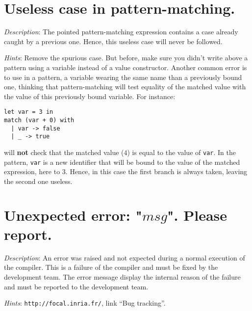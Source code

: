 \section*{Useless case in pattern-matching.}

{\em Description}: The pointed pattern-matching expression contains a
case already caught by a previous one. Hence, this useless case will
never be followed.

{\em Hints}: Remove the spurious case. But before, make sure you
didn't write above a pattern using a variable instead of a value
constructor. Another common error is to use in a pattern, a variable wearing
the same name than a previously bound one, thinking that
pattern-matching will test equality of the matched value with the
value of this previously bound variable. For instance:

{\scriptsize
\begin{lstlisting}
let var = 3 in
match (var + 0) with
  | var -> false
  | _ -> true
\end{lstlisting}}

\noindent will {\bf not} check that the matched value ($4$) is equal to the
value of \lstinline"var". In the pattern, \lstinline"var" is a new
identifier that will be bound to the value of the matched expression,
here to $3$. Hence, in this case the first branch is always taken, leaving the
second one useless.


\section*{Unexpected error: "$msg$". Please report.}

{\em Description}: An error was raised and not expected during a
normal execution of the compiler. This is a failure of the compiler
and must be fixed by the {\focal} development team. The error message
display the internal reason of the failure and must be reported to the
{\focal} development team.

{\em Hints}: \verb+http://focal.inria.fr/+, link ``Bug tracking''.
